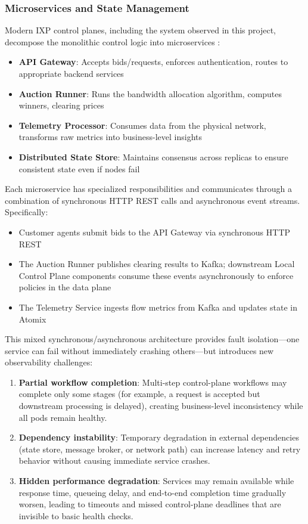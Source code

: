 \subsubsection{Microservices and State Management}

Modern IXP control planes, including the system observed in this project, decompose the monolithic control logic into microservices \citep{babalGrpcMicroservicesGo}:

\begin{itemize}
    \item \textbf{API Gateway}: Accepts bids/requests, enforces authentication, routes to appropriate backend services
    \item \textbf{Auction Runner}: Runs the bandwidth allocation algorithm, computes winners, clearing prices
    \item \textbf{Telemetry Processor}: Consumes data from the physical network, transforms raw metrics into business-level insights
    \item \textbf{Distributed State Store}: Maintains consensus across replicas to ensure consistent state even if nodes fail
\end{itemize}

Each microservice has specialized responsibilities and communicates through a combination of synchronous HTTP REST calls and asynchronous event streams. Specifically:
\begin{itemize}
    \item Customer agents submit bids to the API Gateway via synchronous HTTP REST
    \item The Auction Runner publishes clearing results to Kafka; downstream Local Control Plane components consume these events asynchronously to enforce policies in the data plane
    \item The Telemetry Service ingests flow metrics from Kafka and updates state in Atomix
\end{itemize}

This mixed synchronous/asynchronous architecture provides fault isolation---one service can fail without immediately crashing others---but introduces new observability challenges:

\begin{enumerate}
    \item \textbf{Partial workflow completion}: Multi-step control-plane workflows may complete only some stages (for example, a request is accepted but downstream processing is delayed), creating business-level inconsistency while all pods remain healthy.
    \item \textbf{Dependency instability}: Temporary degradation in external dependencies (state store, message broker, or network path) can increase latency and retry behavior without causing immediate service crashes.
    \item \textbf{Hidden performance degradation}: Services may remain available while response time, queueing delay, and end-to-end completion time gradually worsen, leading to timeouts and missed control-plane deadlines that are invisible to basic health checks.
\end{enumerate}

